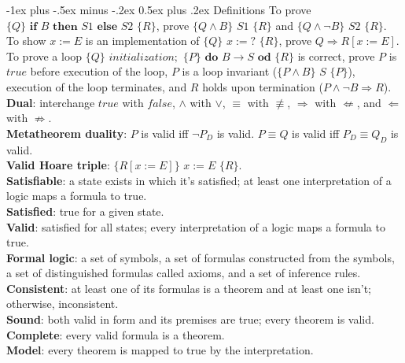 \documentclass[10pt,landscape]{article}
\makeatletter
\renewcommand{\section}{\@startsection{section}{1}{0mm}%
                                {-1ex plus -.5ex minus -.2ex}%
                                {0.5ex plus .2ex}%
                                {\normalfont\small\bfseries}}
\makeatother
\begin{document}
\begin{multicols}{3}
{\section{Definitions}
To prove $\{Q\}\textbf{ if }B\textbf{ then }S1\textbf{ else }S2\,\,\{R\}$, prove $\{Q\land B\}\,\,S1\,\,\{R\}$ and $\{Q\land \neg B\}\,\,S2\,\,\{R\}$.\\
To show $x:=E$ is an implementation of $\{Q\}\,\,x:=?\,\,\{R\}$, prove $Q\Rightarrow R[x:=E]$.\\
To prove a loop $\{Q\}\textit{ initialization};\,\,\{P\}\textbf{ do }B\rightarrow S\textbf{ od }\{R\}$ is correct, prove $P$ is $true$ before execution of the loop, $P$ is a loop invariant ($\{P\land B\}\,\,S\,\,\{P\}$), execution of the loop terminates, and $R$ holds upon termination ($P\land \neg B\Rightarrow R$).\\
\textbf{Dual}: interchange $true$ with $false$, $\land$ with $\lor$, $\equiv$ with $\not\equiv$, $\Rightarrow$ with $\not\Leftarrow$, and $\Leftarrow$ with $\not\Rightarrow$. \\
\textbf{Metatheorem duality}: $P$ is valid iff $\neg P_D$ is valid. $P\equiv Q$ is valid iff $P_D\equiv Q_D$ is valid.\\
\textbf{Valid Hoare triple}: $\{R[x:=E]\}\,\,x:=E\,\,\{R\}$.\\
\textbf{Satisfiable}: a state exists in which it's satisfied; at least one interpretation of a logic maps a formula to true.\\
\textbf{Satisfied}: true for a given state.\\
\textbf{Valid}: satisfied for all states; every interpretation of a logic maps a formula to true.\\
\textbf{Formal logic}: a set of symbols, a set of formulas constructed from the symbols, a set of distinguished formulas called axioms, and a set of inference rules.\\
\textbf{Consistent}: at least one of its formulas is a theorem and at least one isn't; otherwise, inconsistent.\\
\textbf{Sound}: both valid in form and its premises are true; every theorem is valid.\\
\textbf{Complete}: every valid formula is a theorem.\\
\textbf{Model}: every theorem is mapped to true by the interpretation.\\
}
\end{multicols}
\end{document}
